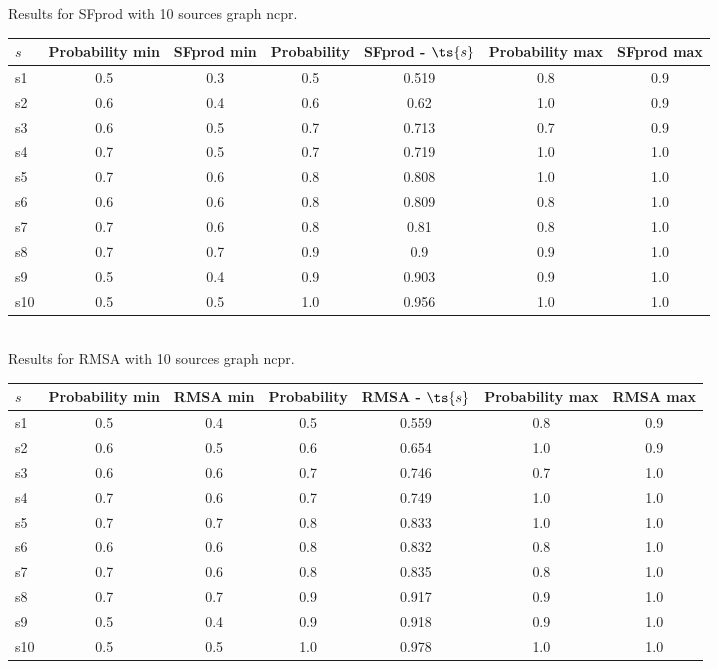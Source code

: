 \documentclass{article}
\begin{document}
\noindent Results for SFprod with 10 sources graph ncpr.

\noindent\begin{tabular}{|l|c|c|c|c|c|c|}
\hline
$s$& Probability min & SFprod min & Probability & SFprod - $\ts{s}$ & Probability max & SFprod max\\
\hline
s1 &0.5 & 0.3 & 0.5 & 0.519 & 0.8 & 0.9\\
\hline
s2 &0.6 & 0.4 & 0.6 & 0.62 & 1.0 & 0.9\\
\hline
s3 &0.6 & 0.5 & 0.7 & 0.713 & 0.7 & 0.9\\
\hline
s4 &0.7 & 0.5 & 0.7 & 0.719 & 1.0 & 1.0\\
\hline
s5 &0.7 & 0.6 & 0.8 & 0.808 & 1.0 & 1.0\\
\hline
s6 &0.6 & 0.6 & 0.8 & 0.809 & 0.8 & 1.0\\
\hline
s7 &0.7 & 0.6 & 0.8 & 0.81 & 0.8 & 1.0\\
\hline
s8 &0.7 & 0.7 & 0.9 & 0.9 & 0.9 & 1.0\\
\hline
s9 &0.5 & 0.4 & 0.9 & 0.903 & 0.9 & 1.0\\
\hline
s10 &0.5 & 0.5 & 1.0 & 0.956 & 1.0 & 1.0\\
\hline
\end{tabular}\\

\noindent Results for RMSA with 10 sources graph ncpr.

\noindent\begin{tabular}{|l|c|c|c|c|c|c|}
\hline
$s$& Probability min & RMSA min & Probability & RMSA - $\ts{s}$ & Probability max & RMSA max\\
\hline
s1 &0.5 & 0.4 & 0.5 & 0.559 & 0.8 & 0.9\\
\hline
s2 &0.6 & 0.5 & 0.6 & 0.654 & 1.0 & 0.9\\
\hline
s3 &0.6 & 0.6 & 0.7 & 0.746 & 0.7 & 1.0\\
\hline
s4 &0.7 & 0.6 & 0.7 & 0.749 & 1.0 & 1.0\\
\hline
s5 &0.7 & 0.7 & 0.8 & 0.833 & 1.0 & 1.0\\
\hline
s6 &0.6 & 0.6 & 0.8 & 0.832 & 0.8 & 1.0\\
\hline
s7 &0.7 & 0.6 & 0.8 & 0.835 & 0.8 & 1.0\\
\hline
s8 &0.7 & 0.7 & 0.9 & 0.917 & 0.9 & 1.0\\
\hline
s9 &0.5 & 0.4 & 0.9 & 0.918 & 0.9 & 1.0\\
\hline
s10 &0.5 & 0.5 & 1.0 & 0.978 & 1.0 & 1.0\\
\hline
\end{tabular}\\
\end{document}
